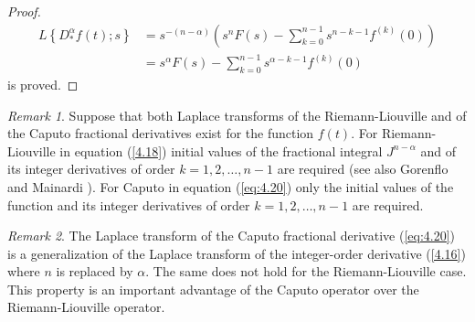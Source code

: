 \documentclass[a4paper,14pt,oneside]{book}
\theoremstyle{plain}
\theoremstyle{definition}
\theoremstyle{remark}
\newtheorem{rmk}{Remark}[section]
\begin{document}
\begin{center}
\begin{flushleft}
{\begin{proof}
$$\begin{aligned}
L\left\{D_{*}^{\alpha} f(t) ; s\right\}&=s^{-(n-\alpha)}\left(s^{n} F(s)-\sum_{k=0}^{n-1} s^{n-k-1} f^{(k)}(0)\right)\\
&=s^{\alpha} F(s)-\sum_{k=0}^{n-1} s^{\alpha-k-1} f^{(k)}(0)
\end{aligned}
$$
is proved.
\end{proof}
\begin{rmk}
Suppose that both Laplace transforms of the Riemann-Liouville and of the Caputo fractional derivatives exist for the function $f(t)$. For Riemann-Liouville in equation (\ref{4.18}) initial values of the fractional integral $J^{n-\alpha}$ and of its integer derivatives of order $k=1,2, \ldots, n-1$ are required (see also Gorenflo and Mainardi \cite{bb18}). For Caputo in equation (\ref{eq:4.20}) only the initial values of the function and its integer derivatives of order $k=1,2, \ldots, n-1$ are required.
\end{rmk}
\begin{rmk}The Laplace transform of the Caputo fractional derivative (\ref{eq:4.20}) is a generalization of the Laplace transform of the integer-order derivative (\ref{4.16}) where $n$ is replaced by $\alpha$. The same does not hold for the Riemann-Liouville case. This property is an important advantage of the Caputo operator over the Riemann-Liouville operator.
\end{rmk}

}
\end{flushleft}
\end{center}
\end{document}
